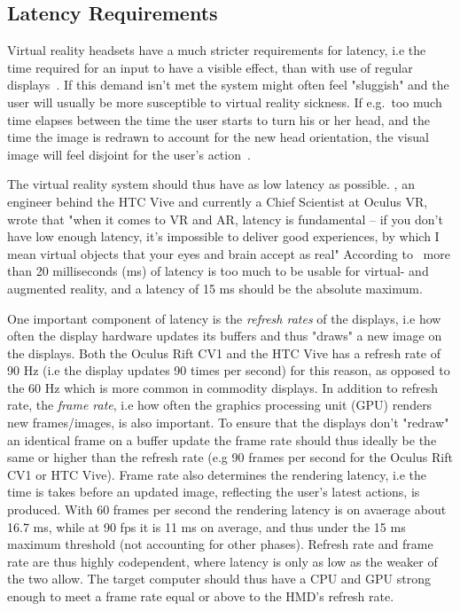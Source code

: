 \subsection{Latency Requirements}
\label{sec:latency_requirements}
Virtual reality headsets have a much stricter requirements for latency, i.e the time required for an input to have a visible effect, 
than with use of regular displays~\citep{ROADTOVR2013}. If this demand isn't met the system might often feel "sluggish" and the user will usually be more susceptible to
virtual reality sickness. %
If e.g.~too much time elapses between the time the user starts to turn his or her head, and the time 
the image is redrawn to account for the new head orientation, the visual image will feel disjoint for the user's action~\citep{Abrash2012}.

The virtual reality system should thus have as low latency as possible. 
\citet{Abrash2012}, an engineer behind the HTC Vive and currently a Chief Scientist at Oculus VR, wrote that "when it comes to VR and AR, latency is fundamental – 
if you don’t have low enough latency, it’s impossible to deliver good experiences, by which I mean virtual objects that your eyes and brain accept as real"
According to~\citet{Abrash2012} more than 20 milliseconds (ms) of latency is too much to be usable for virtual- and augmented reality, 
and a latency of 15 ms should be the absolute maximum.

One important component of latency is the \textit{refresh rates} of the displays, i.e 
how often the display hardware updates its buffers and thus "draws" a new image on the displays. Both the Oculus Rift CV1 and the HTC Vive
has a refresh rate of 90 Hz (i.e the display updates 90 times per second) for this reason, as opposed to the 60 Hz which is more common in commodity displays.
In addition to refresh rate, the \textit{frame rate}, i.e how often the graphics processing unit (GPU) renders new frames/images, is also important. To ensure 
that the displays don't "redraw" an identical frame on a buffer update the frame rate should thus ideally be the same or higher than the refresh 
rate (e.g 90 frames per second for the Oculus Rift CV1 or HTC Vive). Frame rate also determines the rendering latency, i.e the time is takes before 
an updated image, reflecting the user's latest actions, is produced. With 60 frames per second the rendering latency is on avaerage about 16.7 ms, while at 90 fps it is 
11 ms on average, and thus under the 15 ms maximum threshold (not accounting for other phases). %
Refresh rate and frame rate are thus highly codependent, where latency is only as low as the weaker of the two allow. 
The target computer should thus have a CPU and GPU strong enough to meet a frame rate equal or above to the HMD's refresh rate. 

